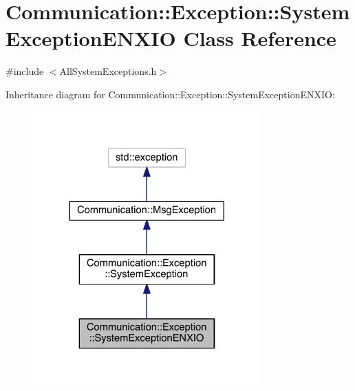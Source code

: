 \hypertarget{class_communication_1_1_exception_1_1_system_exception_e_n_x_i_o}{}\section{Communication\+:\+:Exception\+:\+:System\+Exception\+E\+N\+X\+I\+O Class Reference}
\label{class_communication_1_1_exception_1_1_system_exception_e_n_x_i_o}


{\ttfamily \#include $<$All\+System\+Exceptions.\+h$>$}



Inheritance diagram for Communication\+:\+:Exception\+:\+:System\+Exception\+E\+N\+X\+I\+O\+:\nopagebreak
\begin{figure}[H]
\begin{center}
\leavevmode
\includegraphics[width=248pt]{class_communication_1_1_exception_1_1_system_exception_e_n_x_i_o__inherit__graph}
\end{center}
\end{figure}


